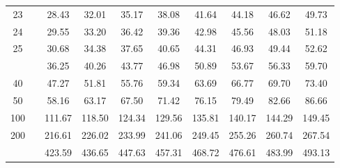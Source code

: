 \documentclass[
]{book}
\begin{document}
\begin{tabular}{cccccccccc}
23 &  & 28.43 & 32.01 & 35.17 & 38.08 & 41.64 & 44.18 & 46.62 & 49.73\\
24 &  & 29.55 & 33.20 & 36.42 & 39.36 & 42.98 & 45.56 & 48.03 & 51.18\\
25 &  & 30.68 & 34.38 & 37.65 & 40.65 & 44.31 & 46.93 & 49.44 & 52.62\\
\addlinespace
30 &  & 36.25 & 40.26 & 43.77 & 46.98 & 50.89 & 53.67 & 56.33 & 59.70\\
40 &  & 47.27 & 51.81 & 55.76 & 59.34 & 63.69 & 66.77 & 69.70 & 73.40\\
50 &  & 58.16 & 63.17 & 67.50 & 71.42 & 76.15 & 79.49 & 82.66 & 86.66\\
100 &  & 111.67 & 118.50 & 124.34 & 129.56 & 135.81 & 140.17 & 144.29 & 149.45\\
200 &  & 216.61 & 226.02 & 233.99 & 241.06 & 249.45 & 255.26 & 260.74 & 267.54\\
\addlinespace
400 &  & 423.59 & 436.65 & 447.63 & 457.31 & 468.72 & 476.61 & 483.99 & 493.13\\
\bottomrule
\end{tabular}

  
\end{document}
